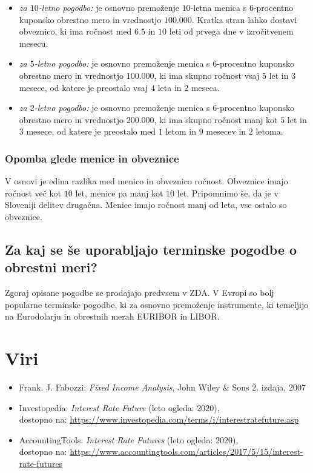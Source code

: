 \documentclass[a4paper, 11pt]{article}
\begin{document}
\begin{itemize}
    \item \textit{za $10$-letno pogodbo:} je osnovno premoženje $10$-letna menica s $6$-procentno
            kuponsko obrestno mero in vrednostjo \textdollar$100.000$. Kratka stran lahko dostavi 
            obveznico, ki ima ročnost med $6.5$ in $10$ leti od prvega dne v izročitvenem mesecu.
    \item \textit{za $5$-letno pogodbo:} je osnovno premoženje menica s $6$-procentno kuponsko 
            obrestno mero in vrednostjo \textdollar$100.000$, ki ima skupno ročnost vsaj $5$ let
            in $3$ mesece, od katere je preostalo vsaj $4$ leta in $2$ meseca.
    \item \textit{za $2$-letno pogodbo:} je osnovno premoženje menica s $6$-procentno kuponsko 
    obrestno mero in vrednostjo \textdollar$200.000$, ki ima skupno ročnost manj kot $5$ let
    in $3$ mesece, od katere je preostalo med $1$ letom in $9$ mesecev in $2$ letoma.
\end{itemize} 

\subsubsection{Opomba glede menice in obveznice}
V osnovi je edina razlika med menico in obveznico ročnost. Obveznice imajo ročnost več kot $10$
let, menice pa manj kot $10$ let. Pripomnimo še, da je v Sloveniji delitev drugačna. Menice imajo
ročnost manj od leta, vse ostalo so obveznice.

\subsection{Za kaj se še uporabljajo terminske pogodbe o obrestni meri?}
Zgoraj opisane pogodbe se prodajajo predvsem v ZDA. V Evropi so bolj popularne terminske pogodbe, ki 
za osnovno premoženje instrumente, ki temeljijo na Eurodolarju in obrestnih merah EURIBOR in LIBOR.

\section{Viri}
\begin{itemize}
    \item Frank. J. Fabozzi: \textit{Fixed Income Analysis}, John Wiley \& Sons $2$. izdaja, 2007
    \item Investopedia: \textit{Interest Rate Future} (leto ogleda: $2020$), \\
            dostopno na: \url{https://www.investopedia.com/terms/i/interestratefuture.asp}
            \item AccountingTools: \textit{Interest Rate Futures} (leto ogleda: $2020$), \\
            dostopno na: \url{https://www.accountingtools.com/articles/2017/5/15/interest-rate-futures}
\end{itemize}
\end{document}
